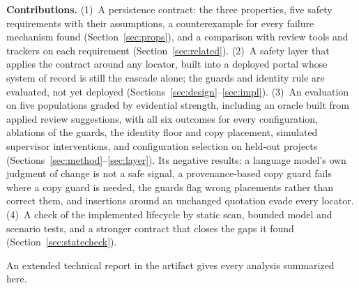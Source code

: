 \textbf{Contributions.} (1)~A persistence contract: the three properties, five safety requirements with their assumptions, a counterexample for every failure mechanism found (Section~\ref{sec:props}), and a comparison with review tools and trackers on each requirement (Section~\ref{sec:related}). (2)~A safety layer that applies the contract around any locator, built into a deployed portal whose system of record is still the cascade alone; the guards and identity rule are evaluated, not yet deployed (Sections~\ref{sec:design}--\ref{sec:impl}). (3)~An evaluation on five populations graded by evidential strength, including an oracle built from applied review suggestions, with all six outcomes for every configuration, ablations of the guards, the identity floor and copy placement, simulated supervisor interventions, and configuration selection on held-out projects (Sections~\ref{sec:method}--\ref{sec:layer}). Its negative results: a language model's own judgment of change is not a safe signal, a provenance-based copy guard fails where a copy guard is needed, the guards flag wrong placements rather than correct them, and insertions around an unchanged quotation evade every locator. (4)~A check of the implemented lifecycle by static scan, bounded model and scenario tests, and a stronger contract that closes the gaps it found (Section~\ref{sec:statecheck}).

An extended technical report in the artifact gives every analysis summarized here.
